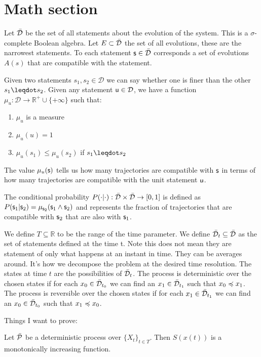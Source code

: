 \documentclass[letterpaper]{article}
\begin{document}
\section{Math section}

Let $\tdomain$ be the set of all statements about the evolution of the system. This is a $\sigma$-complete Boolean algebra. Let $E \subset \tdomain$ the set of all evolutions, these are the narrowest statements. To each statement $\stmt \in \tdomain$ corresponds a set of evolutions $A(s)$ that are compatible with the statement.

Given two statements $s_1, s_2 \in \mathcal{D}$ we can say whether one is finer than the other $s_1 \finer s_2$. Given any statement $\stmt[u] \in \mathcal{D}$, we have a function $\mu_u : \mathcal{D} \to \mathbb{R}^+\cup \{+\infty \}$ such that:
\begin{enumerate}
	\item $\mu_u$ is a measure
	\item $\mu_u(u) = 1$
	\item $\mu_u(s_1) \leq \mu_u(s_2)$ if $s_1 \finer s_2$
\end{enumerate}
The value $\mu_u(\stmt)$ tells us how many trajectories are compatible with $\stmt$ in terms of how many trajectories are compatible with the unit statement $\stmt[u]$.

The conditional probability $P(\cdot | \cdot) : \tdomain \times \tdomain \to [0,1]$ is defined as $P(\stmt_1 | \stmt_2) = \mu_{\stmt_2}(\stmt_1 \AND \stmt_2)$ and represents the fraction of trajectories that are compatible with $\stmt_2$ that are also with $\stmt_1$.

We define $T \subseteq \mathbb{R}$ to be the range of the time parameter. We define $\tdomain_{t} \subseteq \tdomain$ as the set of statements defined at the time t. Note this does not mean they are statement of only what happens at an instant in time. They can be averages around. It's how we decompose the problem at the desired time resolution. The states at time $t$ are the possibilities of $\tdomain_t$. The process is deterministic over the chosen states if for each $x_0 \in \tdomain_{t_0}$ we can find an $x_1 \in \tdomain_{t_1}$ such that $x_0 \narrower x_1$.  The process is reversible over the chosen states if for each $x_1 \in \tdomain_{t_1}$ we can find an $x_0 \in \tdomain_{t_0}$ such that $x_1 \narrower x_0$.

Things I want to prove:

\begin{prop}
	Let $\tdomain[P]$ be a deterministic process over $\{X_t\}_{t \in T}$. Then $S(x(t))$ is a monotonically increasing function.
\end{prop}
\end{document}
